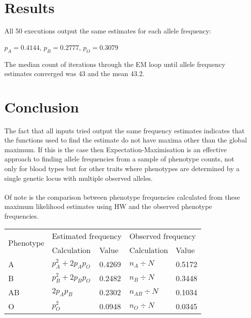 \documentclass{article}
\begin{document}
	\section{Results}
	
	All 50 executions output the same estimates for each allele frequency:
	
	\begin{center} $p_A = 0.4144$, $p_B = 0.2777$, $p_O = 0.3079$ \end{center}
	
	The median count of iterations through the EM loop until allele frequency estimates converged was 43 and the mean 43.2. 
	
	\section{Conclusion}
	
	\paragraph{}The fact that all inputs tried output the same frequency estimates indicates that the functions used to find the estimate do not have maxima other than the global maximum. If this is the case then Expectation-Maximisation is an effective approach to finding allele frequencies from a sample of phenotype counts, not only for blood types but for other traits where phenotypes are determined by a single genetic locus with multiple observed alleles.  
	
	\paragraph{}Of note is the comparison between phenotype frequencies calculated from these maximum likelihood estimates using HW and the observed phenotype frequencies.
	\begin{table}[H]
		\centering
		\begin{tabular}{l|ll|ll}
			\multirow{2}{*}{Phenotype} & \multicolumn{2}{l|}{Estimated frequency}  & \multicolumn{2}{l}{Observed frequency}    \\ \cline{2-5} 
			& \multicolumn{1}{l|}{Calculation} & Value  & \multicolumn{1}{l|}{Calculation} & Value  \\ \hline
			A                          & $p_A^2 + 2p_Ap_O$                & 0.4269 & $n_A \div N$                     & 0.5172 \\
			B                          & $p_B^2 + 2p_Bp_O$                & 0.2482 & $n_B \div N$                     & 0.3448 \\
			AB                         & $2p_Ap_B$                        & 0.2302 & $n_{AB} \div N$                  & 0.1034 \\
			O                          & $p_O^2$                          & 0.0948 & $n_O \div N$                     & 0.0345
		\end{tabular}
	\end{table}
\end{document}
